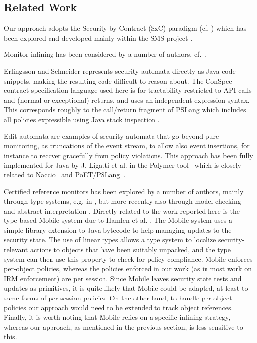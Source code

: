 \documentclass[10pt,twocolumn]{article}
\begin{document}
\subsection{Related Work}
Our approach adopts the Security-by-Contract (SxC) para\-digm (cf. \cite{Bielova2009340,DraMasNalSia07,Desmet200825,javamac,javamop}) which has been explored and developed mainly within the SMS project \cite{s3ms}.

Monitor inlining has been considered by a number of authors, cf.~\cite{ErlSch00,ErlSchb00,Erli04,AktDamGur08,VanPie08}.

Erlingsson and Schneider \cite{ErlSchb00} represents security automata directly as Java code snippets, making the resulting code difficult to reason about. The ConSpec contract specification language used here is for tractability restricted to API calls and (normal or exceptional) returns, and uses an independent expression syntax. This corresponds roughly to the call/return fragment of PSLang which includes all policies expressible using Java stack inspection \cite{ErlSch00}.



Edit automata \cite{LigBauWal05,Lig06} are examples of security automata that go beyond pure monitoring, as truncations of the event stream, to allow also event insertions, for instance to recover gracefully from policy violations. This approach has been fully implemented for Java by J. Ligatti et al. in the Polymer tool~\cite{BauLig05} which is closely related to Naccio~\cite{EvaTwy99} and PoET/PSLang~\cite{ErlSchb00}.

Certified reference monitors has been explored by a number of authors, mainly through type systems, e.g. in \cite{SkalkaSmith04,Bauer02typesand,Wal00,HamMor06,RobMan01}, but more recently also through model checking and abstract interpretation \cite{Srid10,Sridb10}. Directly related to the work reported here is the type-based Mobile system due to Hamlen et al. \cite{HamMor06}. The Mobile system uses a simple library extension to Java bytecode to help managing updates to the security state. The use of linear types allows a type system to localize security-relevant actions to objects that have been suitably unpacked, and the type system can then use this property to check for policy compliance. Mobile enforces per-object policies, whereas the policies enforced in our work (as in most work on IRM enforcement) are per session. Since Mobile leaves security state tests and updates as primitives, it is quite likely that Mobile could be adapted, at least to some forms of per session policies. On the other hand, to handle per-object policies our approach would need to be extended to track object references. Finally, it is worth noting that Mobile relies on a specific inlining strategy, whereas our approach, as mentioned in the previous section, is less sensitive to this.
\end{document}
